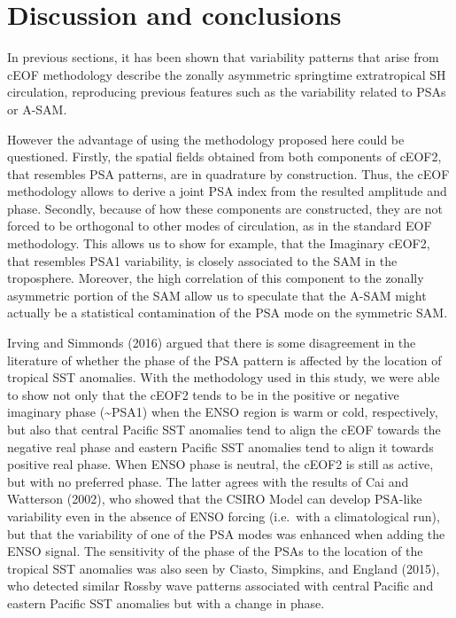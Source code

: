 \documentclass[smallextended]{svjour3}       %
\begin{document}
\hypertarget{discussion}{%
\section{Discussion and conclusions}\label{discussion}}

In previous sections, it has been shown that variability patterns that arise from cEOF methodology describe the zonally asymmetric springtime extratropical SH circulation, reproducing previous features such as the variability related to PSAs or A-SAM.

However the advantage of using the methodology proposed here could be questioned.
Firstly, the spatial fields obtained from both components of cEOF2, that resembles PSA patterns, are in quadrature by construction.
Thus, the cEOF methodology allows to derive a joint PSA index from the resulted amplitude and phase.
Secondly, because of how these components are constructed, they are not forced to be orthogonal to other modes of circulation, as in the standard EOF methodology.
This allows us to show for example, that the Imaginary cEOF2, that resembles PSA1 variability, is closely associated to the SAM in the troposphere.
Moreover, the high correlation of this component to the zonally asymmetric portion of the SAM allow us to speculate that the A-SAM might actually be a statistical contamination of the PSA mode on the symmetric SAM.

Irving and Simmonds (2016) argued that there is some disagreement in the literature of whether the phase of the PSA pattern is affected by the location of tropical SST anomalies.
With the methodology used in this study, we were able to show not only that the cEOF2 tends to be in the positive or negative imaginary phase (\textasciitilde PSA1) when the ENSO region is warm or cold, respectively, but also that central Pacific SST anomalies tend to align the cEOF towards the negative real phase and eastern Pacific SST anomalies tend to align it towards positive real phase.
When ENSO phase is neutral, the cEOF2 is still as active, but with no preferred phase.
The latter agrees with the results of Cai and Watterson (2002), who showed that the CSIRO Model can develop PSA-like variability even in the absence of ENSO forcing (i.e.~with a climatological run), but that the variability of one of the PSA modes was enhanced when adding the ENSO signal.
The sensitivity of the phase of the PSAs to the location of the tropical SST anomalies was also seen by Ciasto, Simpkins, and England (2015), who detected similar Rossby wave patterns associated with central Pacific and eastern Pacific SST anomalies but with a change in phase.
\end{document}
